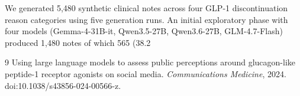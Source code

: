 \documentclass[11pt, a4paper]{article}
\begin{document}
We generated 5,480 synthetic clinical notes across four GLP-1 discontinuation reason categories using five generation runs. An initial exploratory phase with four models (Gemma-4-31B-it, Qwen3.5-27B, Qwen3.6-27B, GLM-4.7-Flash) produced 1,480 notes of which 565 (38.2\\%


\begin{thebibliography}{9}
 Using large language models to assess public perceptions around glucagon-like peptide-1 receptor agonists on social media. \textit{Communications Medicine}, 2024. doi:10.1038/s43856-024-00566-z.
\end{thebibliography}
\end{document}
